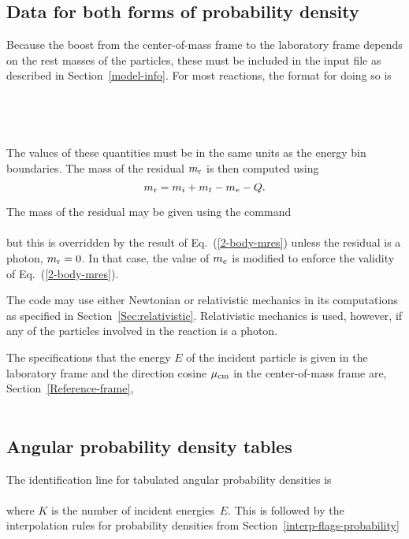 \subsection{Data for both forms of probability density}
\label{Sec:2-body-data}
Because the boost from the center-of-mass frame to the laboratory
frame depends on the rest masses of the particles, these must be included
in the input file as described in Section~\ref{model-info}.  
For most reactions, the format for doing so is\\
   \\
  \\
  \\
  \\
The values of these quantities must be in the same units as
the energy bin boundaries.
The mass of the residual $m_{\text{r}}$ is then computed using
\begin{equation}
   m_{\text{r}} = m_i + m_t - m_e - Q.
 \label{2-body-mres}
\end{equation}

The mass of the residual may be given using the command\\
 \\
but this is overridden by the result of Eq.~(\ref{2-body-mres})
unless the residual is a photon, $m_{\text{r}} = 0$.  In that case,
the value of $m_e$ is modified to enforce the
validity of Eq.~(\ref{2-body-mres}).

The code may use either Newtonian or relativistic mechanics in its
computations as specified in Section~\ref{Sec:relativistic}.  Relativistic
mechanics is used, however, if any of the particles involved in the reaction
is a photon.

The specifications that the energy $E$ of the incident particle is given in the laboratory
frame and the direction cosine $\mu_{\text{cm}}$ in the center-of-mass frame are,
Section~\ref{Reference-frame},\\
  \\

\subsection{Angular probability density tables}
\label{Sec:angular-table}
The identification line for tabulated angular probability densities
is\\
  \\
where $K$ is the number of incident energies~$E$.
This is followed by the interpolation rules for probability
densities from Section~\ref{interp-flags-probability}\\
  \\

